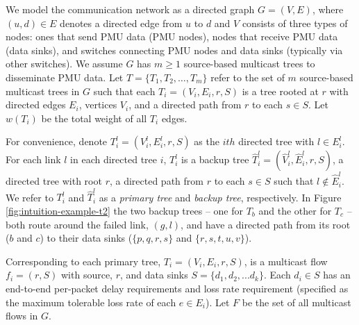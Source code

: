 We model the communication network as a directed graph $G=(V,E)$, where $(u,d) \in E$ denotes a directed edge from $u$ to $d$ and 
$V$ consists of three types of nodes: ones that send PMU data (PMU nodes), nodes that receive PMU data (data sinks), and switches connecting PMU nodes and data sinks (typically via other switches).
We assume $G$ has $m\geq1$ source-based multicast trees to disseminate PMU data.   Let $T=\{T_1,T_2, \dots ,T_m\}$ refer to the set of $m$ source-based multicast trees in $G$
such that each $T_i = (V_i,E_i,r,S)$ is a tree rooted at $r$ with directed edges $E_i$, vertices $V_i$, and a directed path from $r$ to each $s \in S$.  Let $w(T_i)$ be the total weight of 
all $T_i$ edges.

For convenience, denote $T^l_i = (V^l_i,E^l_i,r,S)$ as the $ith$ directed tree with $l \in E^l_i$.  For each link $l$ in each directed tree $i$, $T^l_i$ is a backup tree 
$\hat{T}^l_i=(\hat{V}^l_i,\hat{E}^l_i,r,S)$, a directed tree with root $r$, a directed path from $r$ to each $s \in S$ such that $l \notin \hat{E}^l_i$.  
We refer to  $T^l_i$ and $\hat{T}^l_i$ as a {\em primary tree} and {\em backup tree}, respectively.  In Figure \ref{fig:intuition-example-t2} the two backup trees -- one for $T_b$ and the other for
$T_c$ -- both route around the failed link, $(g,l)$, and have a directed path from its root ($b$ and $c$) to their data sinks ($\{p,q,r,s\}$ and $\{r,s,t,u,v\}$).



Corresponding to each primary tree, $T_i = (V_i,E_i,r,S)$, is a multicast flow $f_i =(r,S)$ with source, $r$, and data sinks $S=\{d_1, d_2, ... d_k\}$. Each $d_i \in S$ has an end-to-end per-packet
delay requirements and loss rate requirement (specified as the maximum tolerable loss rate of each $e \in E_i$).
Let $F$ be the set of all multicast flows in $G$. 

